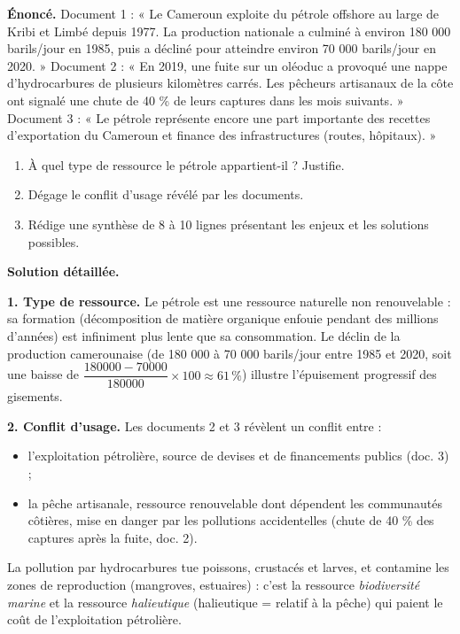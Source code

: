 \documentclass[11pt]{article}
\newcommand{\cle}[1]{{\popxbold\color{popdark}#1}}
\begin{document}
\begin{exoresolu}
\textbf{Énoncé.} Document 1 : « Le Cameroun exploite du pétrole offshore au large de Kribi et Limbé depuis 1977. La production nationale a culminé à environ 180 000 barils/jour en 1985, puis a décliné pour atteindre environ 70 000 barils/jour en 2020. » Document 2 : « En 2019, une fuite sur un oléoduc a provoqué une nappe d'hydrocarbures de plusieurs kilomètres carrés. Les pêcheurs artisanaux de la côte ont signalé une chute de 40 \% de leurs captures dans les mois suivants. » Document 3 : « Le pétrole représente encore une part importante des recettes d'exportation du Cameroun et finance des infrastructures (routes, hôpitaux). »
\begin{enumerate}
\item À quel type de ressource le pétrole appartient-il ? Justifie.
\item Dégage le conflit d'usage révélé par les documents.
\item Rédige une synthèse de 8 à 10 lignes présentant les enjeux et les solutions possibles.
\end{enumerate}
\tcblower
\textbf{Solution détaillée.}

\textbf{1. Type de ressource.} Le pétrole est une ressource naturelle \cle{non renouvelable} : sa formation (décomposition de matière organique enfouie pendant des millions d'années) est infiniment plus lente que sa consommation. Le déclin de la production camerounaise (de 180 000 à 70 000 barils/jour entre 1985 et 2020, soit une baisse de $\dfrac{180000-70000}{180000}\times 100 \approx 61\,\%$) illustre l'épuisement progressif des gisements.

\textbf{2. Conflit d'usage.} Les documents 2 et 3 révèlent un conflit entre :
\begin{itemize}
\item l'exploitation pétrolière, source de devises et de financements publics (doc. 3) ;
\item la pêche artisanale, ressource renouvelable dont dépendent les communautés côtières, mise en danger par les pollutions accidentelles (chute de 40 \% des captures après la fuite, doc. 2).
\end{itemize}
La pollution par hydrocarbures tue poissons, crustacés et larves, et contamine les zones de reproduction (mangroves, estuaires) : c'est la ressource \emph{biodiversité marine} et la ressource \emph{halieutique} (halieutique = relatif à la pêche) qui paient le coût de l'exploitation pétrolière.


\end{exoresolu}
\end{document}
